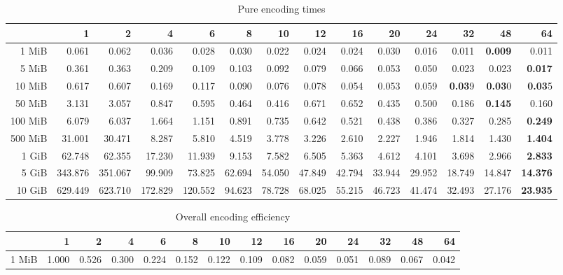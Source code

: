 \begin{centering}
\begin{table}[!h]
\end{table}
\begin{table}[!h]
	\caption{Pure encoding times}
	\begin{tabular}{rrrrrrrrrrrrrr}
		\toprule
		\diagbox[width=7em]{Size}{Threads}  &      1  &      2  &      4  &      6  &     8  &     10 &     12 &     16 &     20 &     24 &     32 &     48 &     64 \\
		\midrule
		1 MiB   &   0.061 &   0.062 &   0.036 &   0.028 &  0.030 &  0.022 &  0.024 &  0.024 &  0.030 &  0.016 &  0.011 &  \textbf{0.009} &  0.011 \\
		5 MiB   &   0.361 &   0.363 &   0.209 &   0.109 &  0.103 &  0.092 &  0.079 &  0.066 &  0.053 &  0.050 &  0.023 &  0.023 &  \textbf{0.017} \\
		10 MiB  &   0.617 &   0.607 &   0.169 &   0.117 &  0.090 &  0.076 &  0.078 &  0.054 &  0.053 &  0.059 &  \textbf{0.03}9 &  \textbf{0.03}0 &  \textbf{0.03}5 \\
		50 MiB  &   3.131 &   3.057 &   0.847 &   0.595 &  0.464 &  0.416 &  0.671 &  0.652 &  0.435 &  0.500 &  0.186 &  \textbf{0.145} &  0.160 \\
		100 MiB &   6.079 &   6.037 &   1.664 &   1.151 &  0.891 &  0.735 &  0.642 &  0.521 &  0.438 &  0.386 &  0.327 &  0.285 &  \textbf{0.249} \\
		500 MiB &  31.001 &  30.471 &   8.287 &   5.810 &  4.519 &  3.778 &  3.226 &  2.610 &  2.227 &  1.946 &  1.814 &  1.430 &  \textbf{1.404} \\
		1 GiB   &  62.748 &  62.355 &  17.230 &  11.939 &  9.153 &  7.582 &  6.505 &  5.363 &  4.612 &  4.101 &  3.698 &  2.966 &  \textbf{2.833} \\
		5 GiB   & 343.876 & 351.067 &  99.909 &  73.825 & 62.694 & 54.050 & 47.849 & 42.794 & 33.944 & 29.952 & 18.749 & 14.847 & \textbf{14.376} \\
		10 GiB  & 629.449 & 623.710 & 172.829 & 120.552 & 94.623 & 78.728 & 68.025 & 55.215 & 46.723 & 41.474 & 32.493 & 27.176 & \textbf{23.935} \\
		\bottomrule
	\end{tabular}
\end{table}
\begin{table}[!h]
	\caption{Overall encoding efficiency}
	\begin{tabular}{rrrrrrrrrrrrrr}
		\toprule
		\diagbox[width=7em]{Size}{Threads}&    1  &    2  &    4  &    6  &    8  &    10 &    12 &    16 &    20 &    24 &    32 &    48 &    64 \\
		\midrule
		1 MiB   & 1.000 & 0.526 & 0.300 & 0.224 & 0.152 & 0.122 & 0.109 & 0.082 & 0.059 & 0.051 & 0.089 & 0.067 & 0.042 \\

\end{tabular}
\end{table}
\end{centering}

